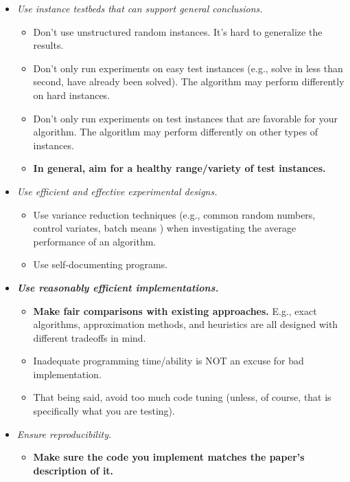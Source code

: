 \documentclass[12pt]{article}
\begin{document}
\begin{itemize}
\begin{itemize}
        \end{itemize}
    \item \emph{Use instance testbeds that can support general conclusions.}
        \begin{itemize}
            \item Don't use unstructured random instances. It's hard to generalize the results.
            \item Don't only run experiments on easy test instances (e.g., solve in less than second, have already been solved).  The algorithm may perform differently on hard instances.
            \item Don't only run experiments on test instances that are favorable for your algorithm.  The algorithm may perform differently on other types of instances.
            \item \textbf{In general, aim for a healthy range/variety of test instances.}
        \end{itemize}
    \item \emph{Use efficient and effective experimental designs.}
        \begin{itemize}
            \item Use variance reduction techniques (e.g., common random numbers, control variates, batch means \cite{mcgeoch1992analyzing, fishman1997implementation}) when investigating the average performance of an algorithm.
            \item Use self-documenting programs.
        \end{itemize}
    \item \textbf{\emph{Use reasonably efficient implementations.}}
        \begin{itemize}
            \item \textbf{Make fair comparisons with existing approaches.} E.g., exact algorithms, approximation methods, and heuristics are all designed with different tradeoffs in mind.
            \item Inadequate programming time/ability is NOT an excuse for bad implementation.
            \item That being said, avoid too much code tuning (unless, of course, that is specifically what you are testing).
        \end{itemize}
    \item \emph{Ensure reproducibility.}
        \begin{itemize}
            \item \textbf{Make sure the code you implement matches the paper's description of it.}

\end{itemize}
\end{itemize}
\end{document}
